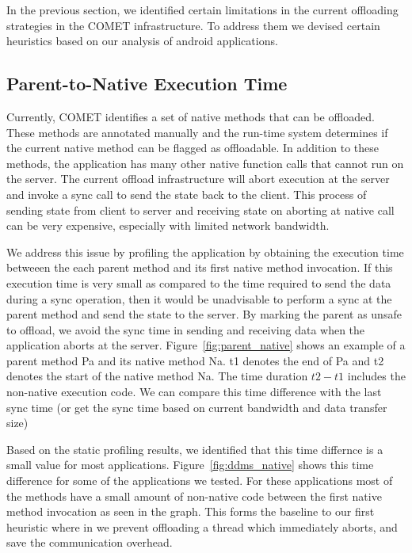 In the previous section, we identified certain limitations in the current offloading strategies
in the COMET infrastructure. To address them we devised certain heuristics based on our analysis
of android applications.

\subsection{Parent-to-Native Execution Time}
Currently, COMET identifies a set of native methods that can be offloaded. These methods are annotated manually
and the run-time system determines if the current native method can be flagged as offloadable. In addition to these methods, the application has many other native function calls
that cannot run on the server. The current offload infrastructure will abort execution at the server and invoke a sync
call to send the state back to the client. This process of sending state from client to server and receiving state on
aborting at native call can be very expensive, especially with limited network bandwidth.

We address this issue by profiling the application by obtaining the execution time betweeen the each parent method and its
first native method invocation. If this execution time is very small as compared to the time required to send the data during
a sync operation, then it would be unadvisable to perform a sync at the parent method and send the state to the server. By marking the parent as
unsafe to offload, we avoid the sync time in sending and receiving data when the application aborts at the server.
Figure~\ref{fig:parent_native} shows an example of a parent method Pa and its native method Na. t1 denotes the end of Pa and t2
denotes the start of the native method Na. The time duration $t2-t1$ includes the non-native execution code. We can compare this
time difference with the last sync time (or get the sync time based on current bandwidth and data transfer size)

Based on the static profiling results, we identified that this time differnce is a small value for most applications.
Figure~\ref{fig:ddms_native} shows this time difference for some of the applications we tested. For these applications
most of the methods have a small amount of non-native code between the first native method invocation as seen in the
graph. This forms the baseline to our first heuristic where in we prevent offloading a thread which immediately aborts, and save the communication overhead.

